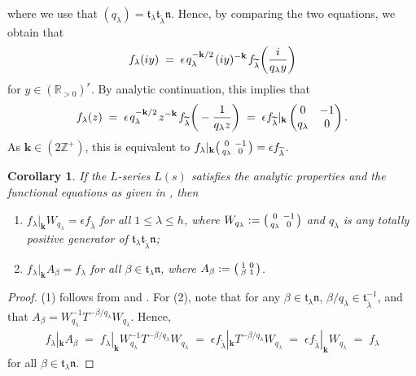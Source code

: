 \documentclass[11pt]{amsart}
\newtheorem{corol}[theorem]{Corollary}
\theoremstyle{remark}
\newcommand\m[1]{\begin{pmatrix}#1\end{pmatrix}}
\newcommand\sm[1]{\begin{psmallmatrix}#1\end{psmallmatrix}}
\newcommand\mbf[1]{\mathbf{#1}}
\newcommand\fr[1]{\mathfrak{#1}}
\newcommand\wt[1]{\widetilde{#1}}
\newcommand{\inte}{\mathbb{Z}}
\newcommand{\real}{\mathbb{R}}
\newcommand{\eq}{\;=\;}
\def\thin{{\hskip 1pt}}
\begin{document}
where we use that $(q_\lambda)=\fr{t}_\lambda\fr{t}_{\wt{\lambda}}\fr{n}$. Hence, by comparing the two equations, we obtain that
\begin{align*}
    f_\lambda(iy)\eq\epsilon\thin q_\lambda^{-\mbf{k}/2}\thin (iy)^{-\mbf{k}}\thin f_{\wt{\lambda}}\bigg(\frac{i}{q_\lambda y}\bigg)
\end{align*}
for $y\in(\real_{>0})^r$. By analytic continuation, this implies that
\begin{align*}
    f_\lambda(z)\eq \epsilon\thin q_\lambda^{-\mbf{k}/2}\thin z^{-\mbf{k}}\thin f_{\wt{\lambda}}\bigg(-\frac{1}{q_\lambda z}\bigg)\eq \epsilon f_{\wt{\lambda}}|_\mbf{k}\m{0&-1\\q_\lambda&0}.
\end{align*}
As $\mbf{k}\in(2\inte^+)$, this is equivalent to $f_\lambda|_\mbf{k}\sm{0&-1\\q_\lambda&0}=\epsilon f_{\wt{\lambda}}$.

\begin{corol}
\label{fqncorol}
If the $L$-series $L(s)$ satisfies the analytic properties and the functional equations as given in , then 
\begin{enumerate}[label={\rm(\arabic*)}]
    \item $f_\lambda|_\mbf{k}W_{q_\lambda}=\epsilon f_{\wt{\lambda}}$ for all $1\leq \lambda\leq h$, where $W_{q_\lambda}:=\sm{0&-1\\q_\lambda&0}$ and $q_\lambda$ is any totally positive generator of $\fr{t}_\lambda\fr{t}_{\wt{\lambda}}\fr{n}$;
    \item $f_\lambda|_\mbf{k}A_\beta=f_\lambda$ for all $\beta\in\fr{t}_\lambda\fr{n}$, where $A_\beta:=\sm{1&0\\\beta&1}$.
\end{enumerate}
\end{corol}
\begin{proof}
(1) follows from  and . For (2), note that for any $\beta\in\fr{t}_\lambda\fr{n}$, $\beta/q_\lambda\in\fr{t}_{\wt{\lambda}}^{-1}$, and that $A_\beta=W_{q_\lambda}^{-1}T^{-\beta/q_\lambda}W_{q_\lambda}$. Hence, 
\begin{align*}
    f_\lambda|_\mbf{k}A_\beta\eq f_\lambda|_\mbf{k}W_{q_\lambda}^{-1}T^{-\beta/q_\lambda}W_{q_\lambda}\eq\epsilon f_{\wt{\lambda}}|_\mbf{k}T^{-\beta/q_\lambda}W_{q_\lambda}\eq\epsilon f_{\wt{\lambda}}|_\mbf{k}W_{q_\lambda}\eq f_\lambda
\end{align*}
for all $\beta\in\fr{t}_\lambda\fr{n}$.
\end{proof}
\end{document}
